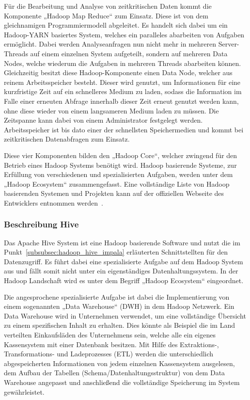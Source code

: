 Für die Bearbeitung und Analyse von zeitkritischen Daten kommt die Komponente
„Hadoop Map Reduce“ zum Einsatz. Diese ist von dem gleichnamigen
Programmiermodell abgeleitet. Es handelt sich dabei um ein Hadoop-YARN
basiertes System, welches ein paralleles abarbeiten von Aufgaben ermöglicht.
Dabei werden Analyseanfragen nun nicht mehr in mehreren Server-Threads auf
einem einzelnen System aufgeteilt, sondern auf mehreren Data Nodes, welche
wiederum die Aufgaben in mehreren Threads abarbeiten können. Gleichzeitig
besitzt diese Hadoop-Komponente einen Data Node, welcher aus reinem
Arbeitsspeicher besteht. Dieser wird genutzt, um Informationen für eine
kurzfristige Zeit auf ein schnelleres Medium zu laden, sodass die Information
im Falle einer erneuten Abfrage innerhalb dieser Zeit erneut genutzt werden
kann, ohne diese wieder von einem langsameren Medium laden zu müssen. Die
Zeitspanne kann dabei von einem Administrator festgelegt werden.
Arbeitsspeicher ist bis dato einer der schnellsten Speichermedien und kommt bei
zeitkritischen Datenabfragen zum Einsatz.

Diese vier Komponenten bilden den „Hadoop Core“, welcher zwingend für den
Betrieb eines Hadoop Systems benötigt wird. Hadoop basierende Systeme, zur
Erfüllung von verschiedenen und spezialisierten Aufgaben, werden unter dem
„Hadoop Ecosystem“ zusammengefasst. Eine vollständige Liste von Hadoop
basierenden Systemen und Projekten kann auf der offiziellen Webseite des
Entwicklers entnommen werden~\cite{Hadoop_related_projects}.
\nl%

\subsubsection{Beschreibung Hive}
\label{subsubsec:hadoop_beschreibung}
Das Apache Hive System ist eine Hadoop basierende Software und nutzt die im
Punkt~\ref{subsubsec:hadoop_hive_impala} erläuterten Schnittstellten für den
Datenzugriff. Es führt dabei eine spezialisierte Aufgabe auf dem Hadoop System
aus und fällt somit nicht unter ein eigenständiges Datenhaltungssystem. In der
Hadoop Landschaft wird es unter dem Begriff „Hadoop Ecosystem“ eingeordnet.

Die angesprochene spezialisierte Aufgabe ist dabei die Implementierung von
einem sogenannten „Data Warehouse“ (DWH) in dem Hadoop Netzwerk. Ein Data
Warehouse wird in Unternehmen verwendet, um eine vollständige Übersicht zu
einem spezifischen Inhalt zu erhalten. Dies könnte als Beispiel die im Land
verteilten Einkaufsläden des Unternehmens sein, welche alle ein eigenes
Kassensystem mit einer Datenbank besitzen. Mit Hilfe des Extraktions-,
Transformations- und Ladeprozesses (ETL) werden die unterschiedlich
abgespeicherten Informationen von jedem einzelnen Kassensystem ausgelesen, dem
Aufbau der Tabellen (Schema/Datenhaltungsstruktur) von dem Data Warehouse
angepasst und anschließend die vollständige Speicherung im System
gewährleistet.

